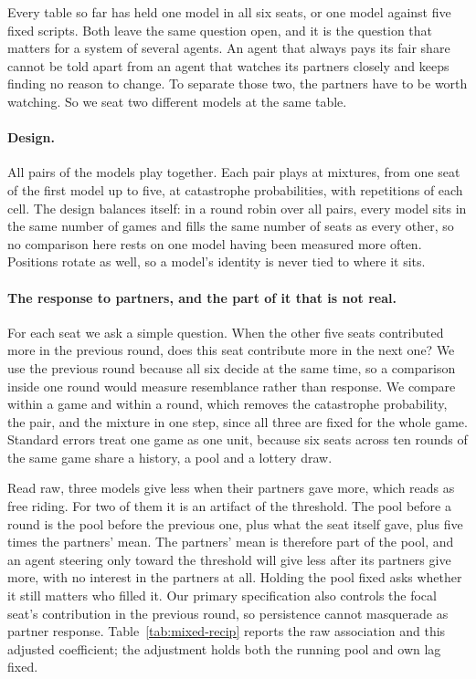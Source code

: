 Every table so far has held one model in all six seats, or one model against five fixed
scripts. Both leave the same question open, and it is the question that matters for a
system of several agents. An agent that always pays its fair share cannot be told apart
from an agent that watches its partners closely and keeps finding no reason to change.
To separate those two, the partners have to be worth watching. So we seat two different
models at the same table.

\paragraph{Design.}
All \EthreebPairs{} pairs of the \EthreebModels{} models play together. Each pair plays at
\EthreebMixtures{} mixtures, from one seat of the first model up to five, at
\EthreebRisks{} catastrophe probabilities, with \EthreebReps{} repetitions of each cell.
The design balances itself: in a round robin over all pairs, every model sits in the same
number of games and fills the same number of seats as every other, so no comparison here
rests on one model having been measured more often. Positions rotate as well, so a model's
identity is never tied to where it sits.

\paragraph{The response to partners, and the part of it that is not real.}
For each seat we ask a simple question. When the other five seats contributed more in the
previous round, does this seat contribute more in the next one? We use the previous round
because all six decide at the same time, so a comparison inside one round would measure
resemblance rather than response. We compare within a game and within a round, which
removes the catastrophe probability, the pair, and the mixture in one step, since all
three are fixed for the whole game. Standard errors treat one game as one unit, because
six seats across ten rounds of the same game share a history, a pool and a lottery draw.

Read raw, three models give less when their partners gave more, which reads as free
riding. For two of them it is an artifact of the threshold. The pool before a round is
the pool before the previous one, plus what the seat itself gave, plus five times the
partners' mean. The partners' mean is therefore part of the pool, and an agent steering
only toward the threshold will give less after its partners give more, with no interest
in the partners at all. Holding the pool fixed asks whether it still matters who filled
it. Our primary specification also controls the focal seat's contribution in the previous
round, so persistence cannot masquerade as partner response. Table~\ref{tab:mixed-recip}
reports the raw association and this adjusted coefficient; the adjustment holds both the
running pool and own lag fixed.

